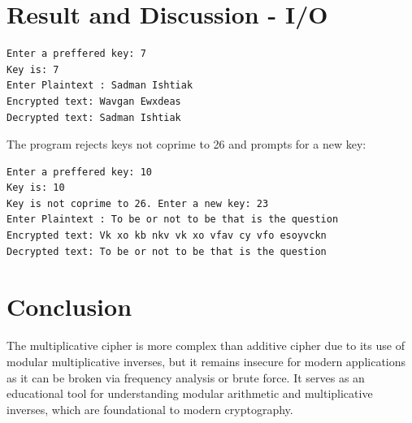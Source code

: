 \section{Result and Discussion - I/O}
\begin{verbatim}
Enter a preffered key: 7
Key is: 7
Enter Plaintext : Sadman Ishtiak
Encrypted text: Wavgan Ewxdeas
Decrypted text: Sadman Ishtiak
\end{verbatim}
The program rejects keys not coprime to 26 and prompts for a new key:
\begin{verbatim}
Enter a preffered key: 10
Key is: 10
Key is not coprime to 26. Enter a new key: 23
Enter Plaintext : To be or not to be that is the question
Encrypted text: Vk xo kb nkv vk xo vfav cy vfo esoyvckn
Decrypted text: To be or not to be that is the question
\end{verbatim}

\section{Conclusion}
The multiplicative cipher is more complex than additive cipher due to its use of modular multiplicative inverses, but it remains insecure for modern applications as it can be broken via frequency analysis or brute force. It serves as an educational tool for understanding modular arithmetic and multiplicative inverses, which are foundational to modern cryptography.
